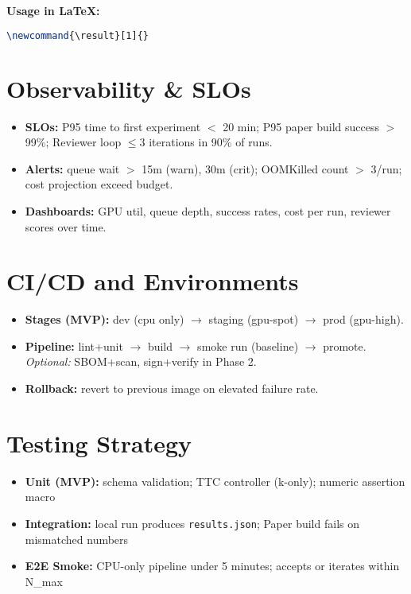\noindent\textbf{Usage in LaTeX:}
\begin{lstlisting}[style=code,language=TeX,caption={Numeric reference macro}]
% \result{variants.self_consistency_k10.rmse} -> 0.191
\newcommand{\result}[1]{}
\end{lstlisting}

\section{Observability \& SLOs}
\begin{itemize}[leftmargin=1.4em]
\item \textbf{SLOs:} P95 time to first experiment $<$ 20 min; P95 paper build success $>$ 99\%; Reviewer loop $\leq 3$ iterations in 90\% of runs.
\item \textbf{Alerts:} queue wait $>$ 15m (warn), 30m (crit); OOMKilled count $>$ 3/run; cost projection exceed budget.
\item \textbf{Dashboards:} GPU util, queue depth, success rates, cost per run, reviewer scores over time.
\end{itemize}

\section{CI/CD and Environments}
\begin{itemize}[leftmargin=1.4em]
\item \textbf{Stages (MVP):} dev (cpu only) $\rightarrow$ staging (gpu-spot) $\rightarrow$ prod (gpu-high).
\item \textbf{Pipeline:} lint+unit $\rightarrow$ build $\rightarrow$ smoke run (baseline) $\rightarrow$ promote. \textit{Optional:} SBOM+scan, sign+verify in Phase 2.
\item \textbf{Rollback:} revert to previous image on elevated failure rate.
\end{itemize}

\section{Testing Strategy}
\begin{itemize}[leftmargin=1.4em]
  \item \textbf{Unit (MVP):} schema validation; TTC controller (k-only); numeric assertion macro
  \item \textbf{Integration:} local run produces \texttt{results.json}; Paper build fails on mismatched numbers
  \item \textbf{E2E Smoke:} CPU-only pipeline under 5 minutes; accepts or iterates within N\_max
\end{itemize}

